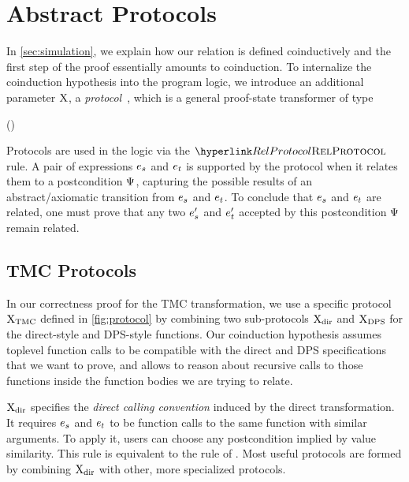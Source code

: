 \section{Abstract Protocols} \label{sec:protocols} \label{subsec:protocols}



In \cref{sec:simulation}, we explain how our relation is defined coinductively and the first step of the proof essentially amounts to coinduction.
To internalize the coinduction hypothesis into the program logic, we introduce an additional parameter $\mathrm{X}$, a \emph{protocol}~\citep*{protocols-2021}, which is a general proof-state transformer of type
\begin{mathline}
(\datalangExpr[] \to \datalangExpr[] \to \iProp) \to \datalangExpr[] \to \datalangExpr[] \to \iProp
\end{mathline}

Protocols are used in the logic via the $\RefTirName{RelProtocol}$ rule.
A pair of expressions $\datalangExpr_s$ and $\datalangExpr_t$ is supported by the protocol when it relates them to a postcondition $\Psi$, capturing the possible results of an abstract/axiomatic transition from $\datalangExpr_s$ and $\datalangExpr_t$.
To conclude that $\datalangExpr_s$ and $\datalangExpr_t$ are related, one must prove that any two $\datalangExpr_s'$ and $\datalangExpr_t'$ accepted by this postcondition $\Psi$ remain related.

\subsection{TMC Protocols}

In our correctness proof for the TMC transformation, we use a specific protocol $\mathrm{X}_\mathrm{TMC}$ defined in \cref{fig:protocol} by combining two sub-protocols $\mathrm{X}_\mathrm{dir}$ and $\mathrm{X}_\mathrm{DPS}$ for the direct-style and DPS-style functions. Our coinduction hypothesis assumes toplevel function calls to be compatible with the direct and DPS specifications that we want to prove, and allows to reason about recursive calls to those functions inside the function bodies we are trying to relate.

$\mathrm{X}_\mathrm{dir}$ specifies the \emph{direct calling convention} induced by the direct transformation.
It requires $\datalangExpr_s$ and $\datalangExpr_t$ to be function calls to the same function with similar arguments.
To apply it, users can choose any postcondition implied by value similarity.
This rule is equivalent to the  rule of \Simuliris.
Most useful protocols are formed by combining $\mathrm{X}_\mathrm{dir}$ with other, more specialized protocols.

